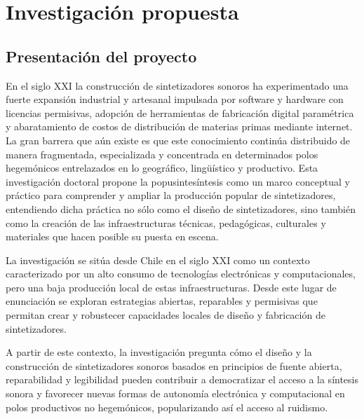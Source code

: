 \documentclass[../proyecto.tex]{subfiles}
\begin{document}
\section{Investigación propuesta}


\subsection{Presentación del proyecto}



En el siglo XXI la construcción de sintetizadores sonoros ha experimentado una fuerte expansión industrial y artesanal impulsada por software y hardware con licencias permisivas, adopción de herramientas de fabricación digital paramétrica y abaratamiento de costos de distribución de materias primas mediante internet. La gran barrera que aún existe es que este conocimiento continúa distribuido de manera fragmentada, especializada y concentrada en determinados polos hegemónicos entrelazados en lo geográfico, lingüístico y productivo. Esta investigación doctoral propone la popusintesíntesis como un marco conceptual y práctico para comprender y ampliar la producción popular de sintetizadores, entendiendo dicha práctica no sólo como el diseño de sintetizadores, sino también como la creación de las infraestructuras técnicas, pedagógicas,  culturales y materiales que hacen posible su puesta en escena.

La investigación se sitúa desde Chile en el siglo XXI como un contexto caracterizado por un alto consumo de tecnologías electrónicas y computacionales, pero una baja producción local de estas infraestructuras. Desde este lugar de enunciación se exploran estrategias abiertas, reparables y permisivas que permitan crear y robustecer capacidades locales de diseño y fabricación de sintetizadores.


A partir de este contexto, la investigación pregunta cómo el diseño y la construcción de sintetizadores sonoros basados en principios de fuente abierta, reparabilidad y legibilidad pueden contribuir a democratizar el acceso a la síntesis sonora y favorecer nuevas formas de autonomía electrónica y computacional en polos productivos no hegemónicos, popularizando así el acceso al ruidismo.
\end{document}
